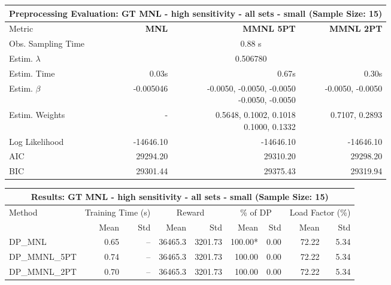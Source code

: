 
\begin{samepage}
\begin{center}
  \small
  \begin{tabular}{l|r|r|r}
    \toprule
    \multicolumn{4}{c}{\textbf{Preprocessing Evaluation: GT MNL - high sensitivity - all sets - small (Sample Size: 15)}} \\
    \midrule
    Metric & \textbf{MNL} & \textbf{MMNL 5PT} & \textbf{MMNL 2PT} \\
    \midrule
    Obs. Sampling Time & \multicolumn{3}{c}{0.88 s} \\
    Estim. $\lambda$ & \multicolumn{3}{c}{0.506780} \\
    Estim. Time & 0.03s & 0.67s & 0.30s \\
    Estim. $\beta$ & -0.005046 & \makecell[tr]{-0.0050, -0.0050, -0.0050 \\ -0.0050, -0.0050} & -0.0050, -0.0050 \\
    Estim. Weights & - & \makecell[tr]{0.5648, 0.1002, 0.1018 \\ 0.1000, 0.1332} & 0.7107, 0.2893 \\
    Log Likelihood & -14646.10 & -14646.10 & -14646.10 \\
    AIC & 29294.20 & 29310.20 & 29298.20 \\
    BIC & 29301.44 & 29375.43 & 29319.94 \\
    \bottomrule
  \end{tabular}
\end{center}
\begin{center}
  \small
  \begin{tabular}{l|rr|rr|rr|rr}
    \toprule
    \multicolumn{9}{c}{\textbf{Results: GT MNL - high sensitivity - all sets - small (Sample Size: 15)}} \\
    \midrule
    Method & \multicolumn{2}{c|}{Training Time (s)} & \multicolumn{2}{c|}{Reward} & \multicolumn{2}{c|}{\% of DP} & \multicolumn{2}{c}{Load Factor (\%)} \\
    & Mean & Std & Mean & Std & Mean & Std & Mean & Std \\
    \midrule
    DP\_MNL      &     0.65 &    -- &    36465.3 &    3201.73 & 100.00* &    0.00 &   72.22 &    5.34 \\
    DP\_MMNL\_5PT &     0.74 &    -- &    36465.3 &    3201.73 &  100.00 &    0.00 &   72.22 &    5.34 \\
    DP\_MMNL\_2PT &     0.70 &    -- &    36465.3 &    3201.73 &  100.00 &    0.00 &   72.22 &    5.34 \\
    \midrule

\end{tabular}
\end{center}
\end{samepage}
